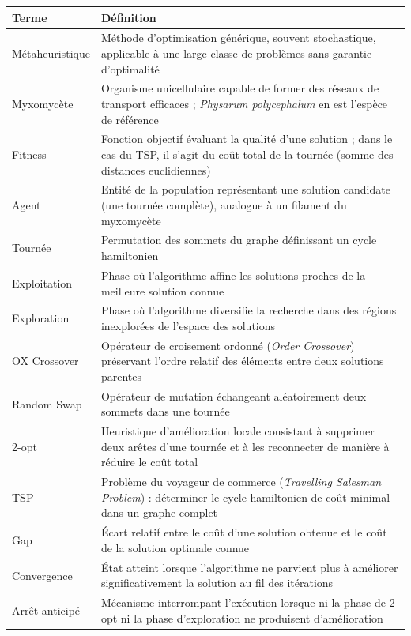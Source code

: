 \documentclass[12pt,a4paper]{report}
\begin{document}
\begin{table}[h]
	\centering
	\begin{tabular}{@{}lp{10cm}@{}}
		\toprule
		\textbf{Terme} & \textbf{Définition} \\
		\midrule
		Métaheuristique & Méthode d'optimisation générique, souvent stochastique, applicable à une large classe de problèmes sans garantie d'optimalité \\
		Myxomycète & Organisme unicellulaire capable de former des réseaux de transport efficaces ; \textit{Physarum polycephalum} en est l'espèce de référence \\
		Fitness & Fonction objectif évaluant la qualité d'une solution ; dans le cas du TSP, il s'agit du coût total de la tournée (somme des distances euclidiennes) \\
		Agent & Entité de la population représentant une solution candidate (une tournée complète), analogue à un filament du myxomycète \\
		Tournée & Permutation des sommets du graphe définissant un cycle hamiltonien \\
		Exploitation & Phase où l'algorithme affine les solutions proches de la meilleure solution connue \\
		Exploration & Phase où l'algorithme diversifie la recherche dans des régions inexplorées de l'espace des solutions \\
		OX Crossover & Opérateur de croisement ordonné (\textit{Order Crossover}) préservant l'ordre relatif des éléments entre deux solutions parentes \\
		Random Swap & Opérateur de mutation échangeant aléatoirement deux sommets dans une tournée \\
		2-opt & Heuristique d'amélioration locale consistant à supprimer deux arêtes d'une tournée et à les reconnecter de manière à réduire le coût total \\
		TSP & Problème du voyageur de commerce (\textit{Travelling Salesman Problem}) : déterminer le cycle hamiltonien de coût minimal dans un graphe complet \\
		Gap & Écart relatif entre le coût d'une solution obtenue et le coût de la solution optimale connue \\
		Convergence & État atteint lorsque l'algorithme ne parvient plus à améliorer significativement la solution au fil des itérations \\
		Arrêt anticipé & Mécanisme interrompant l'exécution lorsque ni la phase de 2-opt ni la phase d'exploration ne produisent d'amélioration \\
		\bottomrule
	\end{tabular}
\end{table}
\end{document}
